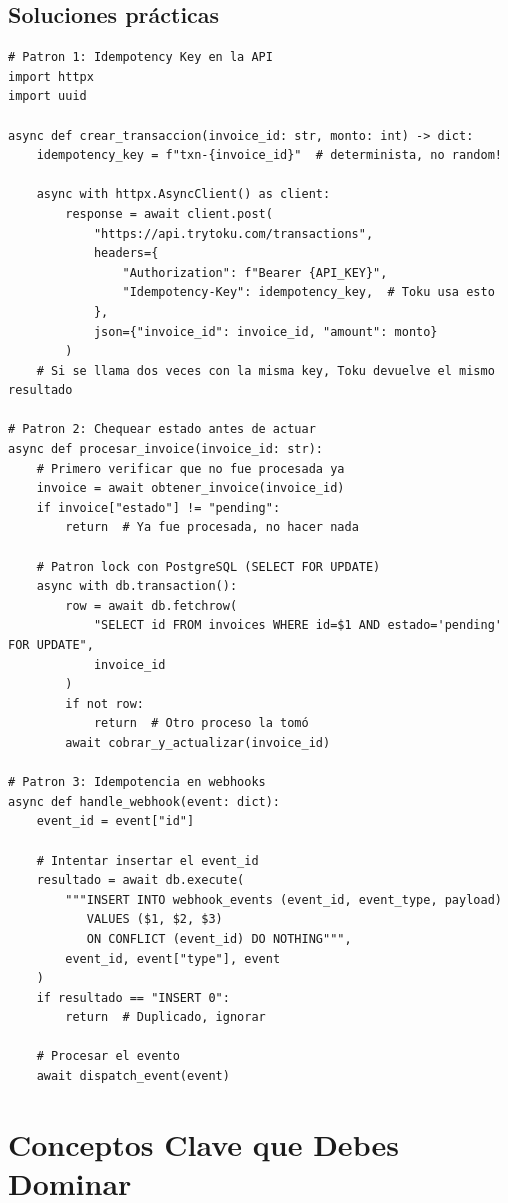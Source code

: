 \documentclass[11pt,a4paper]{article}
\begin{document}
\subsection{Soluciones prácticas}

\begin{lstlisting}[style=python]
# Patron 1: Idempotency Key en la API
import httpx
import uuid

async def crear_transaccion(invoice_id: str, monto: int) -> dict:
    idempotency_key = f"txn-{invoice_id}"  # determinista, no random!

    async with httpx.AsyncClient() as client:
        response = await client.post(
            "https://api.trytoku.com/transactions",
            headers={
                "Authorization": f"Bearer {API_KEY}",
                "Idempotency-Key": idempotency_key,  # Toku usa esto
            },
            json={"invoice_id": invoice_id, "amount": monto}
        )
    # Si se llama dos veces con la misma key, Toku devuelve el mismo resultado

# Patron 2: Chequear estado antes de actuar
async def procesar_invoice(invoice_id: str):
    # Primero verificar que no fue procesada ya
    invoice = await obtener_invoice(invoice_id)
    if invoice["estado"] != "pending":
        return  # Ya fue procesada, no hacer nada

    # Patron lock con PostgreSQL (SELECT FOR UPDATE)
    async with db.transaction():
        row = await db.fetchrow(
            "SELECT id FROM invoices WHERE id=$1 AND estado='pending' FOR UPDATE",
            invoice_id
        )
        if not row:
            return  # Otro proceso la tomó
        await cobrar_y_actualizar(invoice_id)

# Patron 3: Idempotencia en webhooks
async def handle_webhook(event: dict):
    event_id = event["id"]

    # Intentar insertar el event_id
    resultado = await db.execute(
        """INSERT INTO webhook_events (event_id, event_type, payload)
           VALUES ($1, $2, $3)
           ON CONFLICT (event_id) DO NOTHING""",
        event_id, event["type"], event
    )
    if resultado == "INSERT 0":
        return  # Duplicado, ignorar

    # Procesar el evento
    await dispatch_event(event)
\end{lstlisting}

\section{Conceptos Clave que Debes Dominar}
\end{document}
